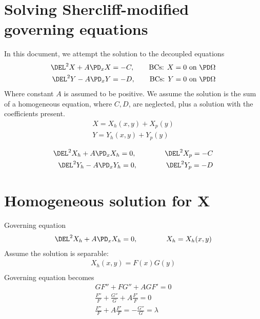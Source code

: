 \documentclass[11pt]{article}
\begin{document}
\doublespacing
\MOONSTITLE

\section{Solving Shercliff-modified governing equations}
In this document, we attempt the solution to the decoupled equations
\begin{equation}\begin{aligned}
\DEL^2 X + A \PD_x X = - C, \qquad \text{BCs: $X = 0 $ on $\PD \Omega$} \\
\DEL^2 Y - A \PD_x Y = - D, \qquad \text{BCs: $Y = 0 $ on $\PD \Omega$} \\
\end{aligned} \end{equation}
Where constant $A$ is assumed to be positive. We assume the solution is the sum of a homogeneous equation, where $C,D$, are neglected, plus a solution with the coefficients present.
\begin{equation}\begin{aligned}
X = X_h(x,y) + X_p(y) \\
Y = Y_h(x,y) + Y_p(y) \\
\end{aligned} \end{equation}
\begin{equation}\begin{aligned}
\DEL^2 X_h + A \PD_x X_h = 0, \qquad\qquad \DEL^2 X_p = -C \\
\DEL^2 Y_h - A \PD_x Y_h = 0, \qquad\qquad \DEL^2 Y_p = -D \\
\end{aligned} \end{equation}

\section{Homogeneous solution for X}
Governing equation
\begin{equation}\begin{aligned}
\DEL^2 X_h + A \PD_x X_h = 0, \qquad\qquad X_h = X_h(x,y) \\
\end{aligned} \end{equation}
Assume the solution is separable:
\begin{equation}\begin{aligned}
X_h(x,y) = F(x)G(y) \\
\end{aligned} \end{equation}
Governing equation becomes
\begin{equation}\begin{aligned}
G F'' + FG'' + A G F' = 0 \\
 \frac{F''}{F} + \frac{G''}{G} + A \frac{F'}{F} = 0 \\
 \frac{F''}{F} + A \frac{F'}{F} = - \frac{G''}{G} = \lambda \\
\end{aligned} \end{equation}
\end{document}
